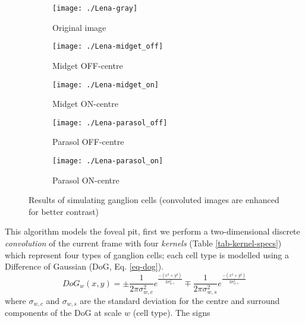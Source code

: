 \begin{figure}[hbt]
  \centering
  \begin{subfigure}[t]{0.15\textwidth}
    \centering
    \captionsetup{justification=centering,margin=0.1cm}
    \texttt{[image: ./Lena-gray]}
    \caption{Original image}
    \label{pic-lena}
  \end{subfigure}
  \begin{subfigure}[t]{0.15\textwidth}
    \centering
    \captionsetup{justification=centering,margin=0.1cm}
    \texttt{[image: ./Lena-midget\_off]}
    \caption{Midget OFF-centre}
    \label{pic-lena-M-OFF}
  \end{subfigure}
  \begin{subfigure}[t]{0.15\textwidth}
    \centering
    \captionsetup{justification=centering,margin=0.1cm}
    \texttt{[image: ./Lena-midget\_on]}
    \caption{Midget ON-centre}
    \label{pic-lena-M-ON}
  \end{subfigure}
  \begin{subfigure}[t]{0.15\textwidth}
    \centering
    \captionsetup{justification=centering,margin=0.1cm}
    \texttt{[image: ./Lena-parasol\_off]}
    \caption{Parasol OFF-centre}
    \label{pic-lena-P-OFF}
  \end{subfigure}
  \begin{subfigure}[t]{0.15\textwidth}
    \centering
    \captionsetup{justification=centering,margin=0.1cm}
    \texttt{[image: ./Lena-parasol\_on]}
    \caption{Parasol ON-centre}
    \label{pic-lena-P-ON}
  \end{subfigure}
  \caption{Results of simulating ganglion cells (convoluted images are enhanced for better contrast)}
  \label{fig-convolution-results}
\end{figure}
This algorithm models the foveal pit, first we perform a two-dimensional 
discrete \emph{convolution} of the current frame with four \emph{kernels} 
(Table \ref{tab-kernel-specs}) which represent four types of ganglion cells; 
each cell type is modelled using a Difference of Gaussian (DoG, Eq. 
\ref{eq-dog}).
\begin{equation}
\label{eq-dog}
DoG_w(x,y) = \pm\frac{1}{2\pi\sigma_{w,c}^2}e^{\frac{-(x^2 + y^2)}{2\sigma_{w,c}^2}}
\mp\frac{1}{2\pi\sigma_{w,s}^2}e^{\frac{-(x^2 + y^2)}{2\sigma_{w,s}^2}}
\end{equation}
where $\sigma_{w,c}$ and $\sigma_{w,s}$ are the standard deviation for the 
centre and surround components of the DoG at scale $w$ (cell type). The signs 
